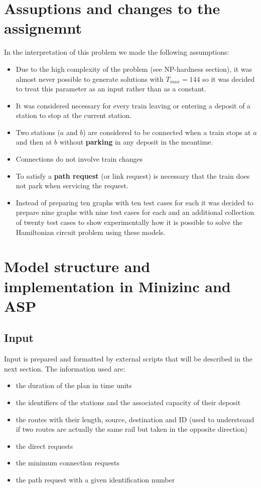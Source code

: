 \documentclass[11pt]{article}
\begin{document}
\section{Assuptions and changes to the assignemnt}
In the interpretation of this problem we made the following assumptions:
\begin{itemize}
\item Due to the high complexity of the problem (see NP-hardness section), it was
almost never possible to generate solutions with $T_{max}=144$ so it was decided
to treat this parameter as an input rather than as a constant.
 
\item It was considered necessary for every train leaving or entering a deposit of a station
to stop at the current station. 
\item Two stations ($a$ and $b$) are considered to be connected when a train stops at $a$
and then at $b$ without \textbf{parking} in any deposit in the meantime.
\item Connections do not involve train changes
\item To satisfy a \textbf{path request} (or link request) is necessary that the train does 
not park when servicing the request.
\item Instead of preparing ten graphs with ten test cases for each it was decided to prepare
nine graphs with nine test cases for each and an additional collection of twenty test cases
to show experimentally how it is possible to solve the Hamiltonian circuit problem using these models.
\end{itemize}
\section{Model structure and implementation in Minizinc and ASP}
\subsection{Input}
Input is prepared and formatted by external scripts that will be described
in the next section. The information used are:
\begin{itemize}
\item the duration of the plan in time units 
\item the identifiers of the stations and the associated capacity of their deposit
\item the routes with their length, source, destination and ID (used to understeand if two routes are actually the same rail but taken in the opposite direction)
\item the direct requests
\item the minimum connection requests
\item the path request with a given identification number 
\end{itemize}
\end{document}
